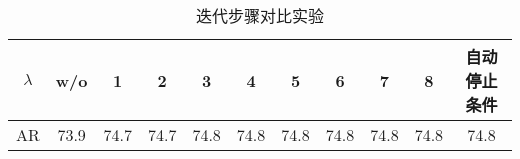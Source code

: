 \begin{table}[ht]
  \centering
  \caption{迭代步骤对比实验}
  \begin{tabular}{c|c|c|c|c|c|c|c|c|c|c}
    \toprule
    $\lambda$ & w/o & 1 & 2 & 3 & 4 & 5 & 6 & 7 & 8 & 自动停止条件 \\
    \midrule
    AR & 73.9 & 74.7 & 74.7 & 74.8 & 74.8 & 74.8 & 74.8 & 74.8 & 74.8 & 74.8 \\
    \bottomrule
  \end{tabular}
  \label{tab:ca_Iteration_Step}
\end{table}

